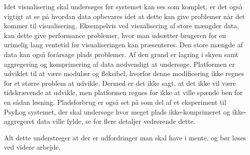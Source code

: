 Idet visualisering skal undersøges før systemet kan ses som komplet, er det også vigtigt at se på hvordan data opbevares idet at dette kan give problemer når det kommer til visualisering. 
Eksempelvis ved visualisering af store mængder data, kan dette give performance problemer, hvor man udsætter brugeren for en urimelig lang ventetid før visualiseringen kan præsenteres. 
Den store mængde af data kan også forårsage plads problemer. 
Af den grund er lagring i skyen samt aggregering og komprimering af data nødvendigt at undersøge.
Platformen er udviklet til at være modulær og fleksibel, hvorfor denne modificering ikke regnes for et større problem at udvikle.
Dermed er det ikke sagt, at det ikke vil være tidskrævende at udvikle, men platformen regnes for ikke at ville spænde ben for en sådan løsning.
Pladsforbrug er også set på som del af et eksperiment til PsyLog systemet, der skal undersøge hvor meget plads ikke-komprimeret og ikke-aggregeret data ville fylde, se \citet[3.4 Pladsforbrug eksperimenter]{misc:faellesrapp} for flere detaljer vedrørende dette.

Alt dette understreger at der er udfordringer man skal have i mente, og bør løses ved videre arbejde.